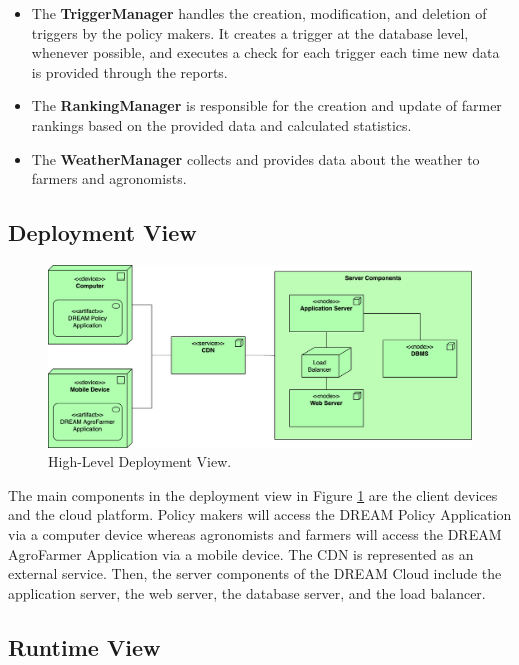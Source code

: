 \begin{itemize}
	\item The \textbf{TriggerManager} handles the creation, modification, and deletion of triggers by the policy makers. It creates a trigger at the database level, whenever possible, and executes a check for each trigger each time new data is provided through the reports.
	\item The \textbf{RankingManager} is responsible for the creation and update of farmer rankings based on the provided data and calculated statistics.
	\item The \textbf{WeatherManager} collects and provides data about the weather to farmers and agronomists.
\end{itemize}

\subsection{Deployment View}
\begin{figure}[hbt!]
\centering
\includegraphics[width=\textwidth]{../images_diagrams/dd/highlevel_deployment.png}
\caption{High-Level Deployment View.}
\label{fig:highLevelDeploy}
\end{figure}

\noindent
The main components in the deployment view in Figure \ref{fig:highLevelDeploy} are the client devices and the cloud platform. Policy makers will access the DREAM Policy Application via a computer device whereas agronomists and farmers will access the DREAM AgroFarmer Application via a mobile device. The CDN is represented as an external service. Then, the server components of the DREAM Cloud include the application server, the web server, the database server, and the load balancer.



\subsection{Runtime View}


